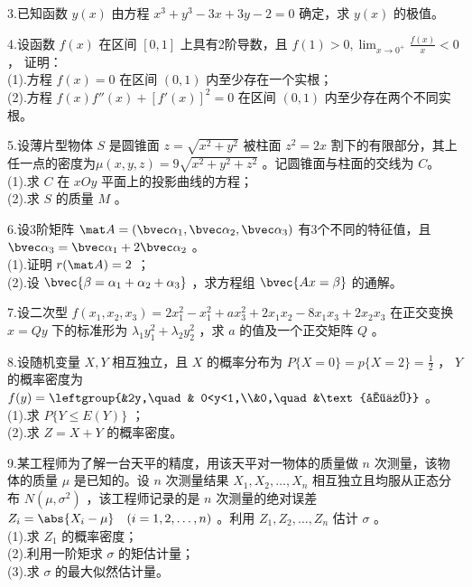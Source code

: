 3.已知函数 $y(x)$ 由方程 $x^3+y^3-3x+3y-2=0$  确定，求 $y(x)$ 的极值。

4.设函数  $f(x)$ 在区间 $[0,1]$  上具有2阶导数，且 $\displaystyle f(1)>0,\lim_{x \to 0^+}\frac{f(x)}{x}<0$ ，  证明：\\
(1).方程 $f(x)=0$  在区间 $(0,1)$ 内至少存在一个实根；\\
(2).方程 $f(x)f''(x)+[f'(x)]^2=0$ 在区间 $(0,1)$ 内至少存在两个不同实根。

5.设薄片型物体 $S$ 是圆锥面  $z=\sqrt{x^2+y^2}$ 被柱面 $z^2=2x$  割下的有限部分，其上任一点的密度为$\mu(x,y,z)=9\sqrt{x^2+y^2+z^2}$   。记圆锥面与柱面的交线为 $C$。\\
(1).求 $C$ 在 $xOy$  平面上的投影曲线的方程；\\
(2).求 $S$ 的质量 $M$ 。

6.设3阶矩阵 $\mat A=(\bvec \alpha_1,\bvec \alpha_2,\bvec \alpha_3)$  有3个不同的特征值，且 $\bvec \alpha_3=\bvec \alpha_1+2\bvec \alpha_2$ 。\\
(1).证明 $r(\mat A)=2$ ；\\
(2).设 $\bvec{\beta=\alpha_1+\alpha_2+\alpha_3}$  ，求方程组 $\bvec{Ax=\beta}$  的通解。

7.设二次型  $f(x_1,x_2,x_3)=2x_1^2-x_1^2+ax_3^2+2x_1x_2-8x_1x_3+2x_2x_3$ 在正交变换  $x=Qy$ 下的标准形为 $\lambda_1y_1^2+\lambda_2y_2^2$  ，求 $a$ 的值及一个正交矩阵 $Q$ 。

8.设随机变量 $X,Y$  相互独立，且 $X$  的概率分布为 $P\{X=0\}=p\{X=2\}=\frac{1}{2}$  ， $Y$ 的概率密度为 $f(y)=\leftgroup{&2y,\quad & 0<y<1,\\&0,\quad &\text{其他}}$ 。\\
(1).求 $P\{Y \le E(Y)\}$ ；\\
(2).求 $Z=X+Y$ 的概率密度。

9.某工程师为了解一台天平的精度，用该天平对一物体的质量做 $n$ 次测量，该物体的质量 $\mu$ 是已知的。设 $n$ 次测量结果 $X_1,X_2,\dots,X_n$  相互独立且均服从正态分布 $N(\mu,\sigma^2)$ ，该工程师记录的是 $n$  次测量的绝对误差 $Z_i=\abs{X_i-\mu} \quad (i=1,2,\dots,n)$  。利用  $Z_1,Z_2,\dots,Z_n$ 估计 $\sigma$ 。\\
(1).求 $Z_1$ 的概率密度；\\
(2).利用一阶矩求 $\sigma$ 的矩估计量；\\
(3).求 $\sigma$ 的最大似然估计量。
